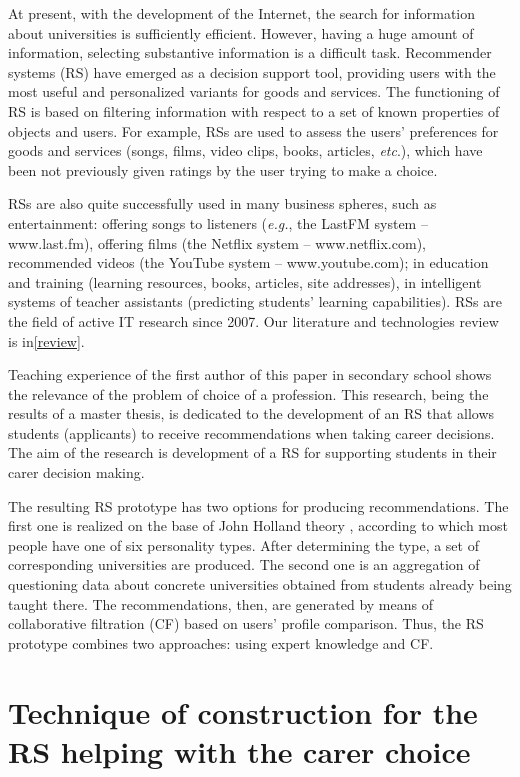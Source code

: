 \documentclass[conference,a4]{IEEEtran}
\begin{document}
At present, with the development of the Internet, the search for information about universities is sufficiently efficient. However, having a huge amount of information, selecting substantive information is a difficult task.  Recommender systems (RS) have emerged as a decision support tool, providing users with the most useful and personalized variants for goods and services.  The functioning of RS is based on filtering information with respect to a set of known properties of objects and users.  For example, RSs are used to assess the users' preferences for goods and services (songs, films, video clips, books, articles, \emph{etc}.), which have been not previously given ratings by the user trying to make a choice.

RSs are also quite successfully used in many business spheres, such as entertainment: offering songs to listeners (\emph{e.g.}, the LastFM system -- www.last.fm), offering films (the Netflix system -- www.netflix.com), recommended videos (the YouTube system -- www.youtube.com); in education and training (learning resources, books, articles, site addresses), in intelligent systems of teacher assistants (predicting students' learning capabilities).  RSs are the field of active IT research since 2007.  Our literature and technologies review is in\ref{review}.

Teaching experience of the first author of this paper in secondary school shows the relevance of the problem of choice of a profession.  This research, being the results of a master thesis, is dedicated to the development of an RS that allows students (applicants) to receive recommendations when taking career decisions.  The aim of the research is development of a RS for supporting students in their carer decision making.

The resulting RS prototype has two options for producing recommendations. The first one is realized on the base of John Holland theory \cite{holland}, according to which most people have one of six personality types.  After determining the type, a set of corresponding universities are produced.  The second one is an aggregation of questioning data about concrete universities obtained from students already being taught there.  The recommendations, then, are generated by means of collaborative filtration (CF) based on users' profile comparison.  Thus, the RS prototype combines two approaches: using expert knowledge and CF.

\section{Technique of construction for the RS helping with the carer choice}
\label{sec:base}
\end{document}

